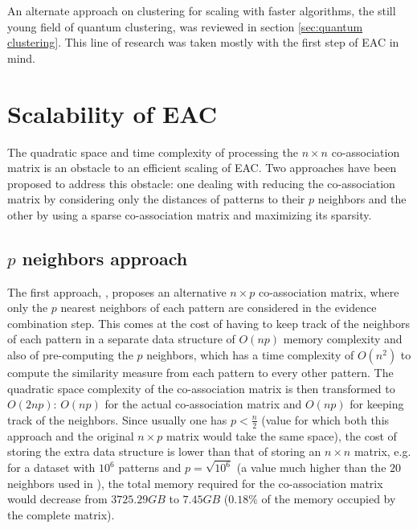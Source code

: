 An alternate approach on clustering for scaling with faster algorithms, the still young field of quantum clustering, was reviewed in section \ref{sec:quantum clustering}.
This line of research was taken mostly with the first step of EAC in mind.



%
%


\section{Scalability of EAC}
\label{sec:eac scaling}
The quadratic space and time complexity of processing the $n \times n$ co-association matrix is an obstacle to an efficient scaling of EAC.
Two approaches have been proposed to address this obstacle: one dealing with reducing the co-association matrix by considering only the distances of patterns to their $p$ neighbors and the other by using a sparse co-association matrix and maximizing its sparsity.

\subsection{$p$ neighbors approach}
The first approach, \cite{Fred2005}, proposes an alternative $n \times p$ co-association matrix, where only the $p$ nearest neighbors of each pattern are considered in the evidence combination step.
This comes at the cost of having to keep track of the neighbors of each pattern in a separate data structure of $O(np)$ memory complexity and also of pre-computing the $p$ neighbors, which has a time complexity of $O(n^2)$ to compute the similarity measure from each pattern to every other pattern.
The quadratic space complexity of the co-association matrix is then transformed to $O(2np)$: $O(np)$ for the actual co-association matrix and $O(np)$ for keeping track of the neighbors.
Since usually one has $p < \frac{n}{2}$ (value for which both this approach and the original $n \times p$ matrix would take the same space), the cost of storing the extra data structure is lower than that of storing an $n \times n$ matrix, e.g. for a dataset with $10^6$ patterns and $p=\sqrt{10^6}$ (a value much higher than the $20$ neighbors used in \cite{Fred2005}), the total memory required for the co-association matrix would decrease from $3725.29 GB$ to $7.45 GB$ ($0.18\%$ of the memory occupied by the complete matrix).

